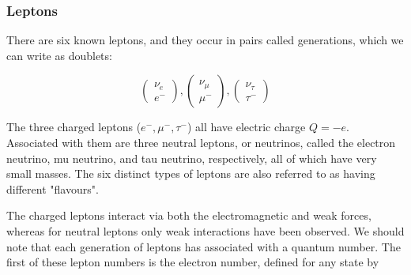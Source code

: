 

\subsubsection{Leptons}
There are six known leptons, and they occur in pairs called generations, which we can write as doublets:

\begin{equation}
	\begin{pmatrix}
		\nu_{e}\\
		e^{-}
	\end{pmatrix},
\begin{pmatrix}
		\nu_{\mu}\\
		\mu^{-}
	\end{pmatrix},
	\begin{pmatrix}
		\nu_{\tau}\\
		\tau^{-}
	\end{pmatrix}
\end{equation}

The three charged leptons ($e^{-}, \mu^{-},\tau^{-}$) all have electric charge $Q=-e$. Associated with them are three neutral leptons, or neutrinos, called the electron neutrino, mu neutrino, and tau neutrino, respectively, all of which have very small masses. The six distinct types of leptons are also referred to as having different "flavours". 


The charged leptons interact via both the electromagnetic and weak forces, whereas for neutral leptons only weak interactions have been observed. We should note that each generation of leptons has associated with a quantum number. The first of these lepton numbers is the electron number, defined for any state by

